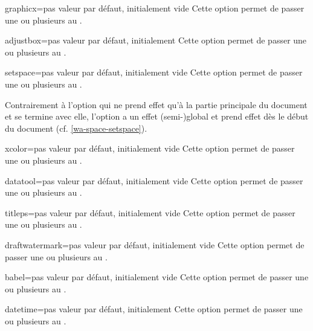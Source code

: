 \begin{docKey}{graphicx}{=}{pas valeur par défaut,
    initialement vide}
  Cette option permet de passer une ou plusieurs  au
  .
\end{docKey}
\begin{docKey}{adjustbox}{=}{pas valeur par défaut,
    initialement }
  Cette option permet de passer une ou plusieurs  au
  .
\end{docKey}
\begin{docKey}{setspace}{=}{pas valeur par défaut,
    initialement vide}
  Cette option permet de passer une ou plusieurs  au
  .

  Contrairement à l'option  qui ne prend effet qu'à la partie
  principale du document et se termine avec elle, l'option 
  a un effet (semi-)global et prend effet dès le début du document
  (cf. \vref{wa-space-setspace}).
\end{docKey}
\begin{docKey}{xcolor}{=}{pas valeur par défaut,
    initialement vide}
  Cette option permet de passer une ou plusieurs  au
  .
\end{docKey}
\begin{docKey}{datatool}{=}{pas valeur par défaut,
    initialement vide}
  Cette option permet de passer une ou plusieurs  au
  .
\end{docKey}
\begin{docKey}{titleps}{=}{pas valeur par défaut, initialement
    vide}
  Cette option permet de passer une ou plusieurs  au
  .
\end{docKey}
\begin{docKey}{draftwatermark}{=}{pas valeur par défaut,
    initialement vide}
  Cette option permet de passer une ou plusieurs  au
  .
\end{docKey}
\begin{docKey}{babel}{=}{pas valeur par défaut,
    initialement vide}
  Cette option permet de passer une ou plusieurs  au
  .
\end{docKey}
\begin{docKey}{datetime}{=}{pas valeur par défaut,
    initialement }
  Cette option permet de passer une ou plusieurs  au
  .
\end{docKey}


